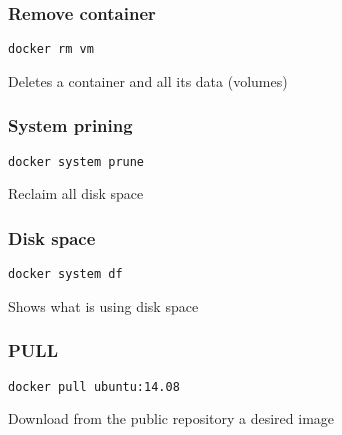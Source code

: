 \begin{frame}[fragile]
\frametitle{Remove container}
\begin{lstlisting}
docker rm vm
\end{lstlisting}

Deletes a container and all its data (volumes) 
\end{frame}


\begin{frame}[fragile]
\frametitle{System prining}
\begin{lstlisting}
docker system prune
\end{lstlisting}

Reclaim all disk space
\end{frame}


\begin{frame}[fragile]
\frametitle{Disk space}
\begin{lstlisting}
docker system df
\end{lstlisting}

Shows what is using disk space
\end{frame}


\begin{frame}[fragile]
\frametitle{PULL}
\begin{lstlisting}
docker pull ubuntu:14.08
\end{lstlisting}

Download from the public repository a desired image
\end{frame}